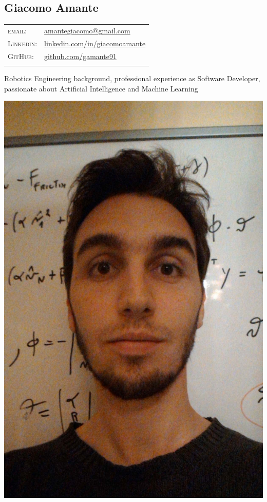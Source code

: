 \documentclass[a4paper,10pt]{article}
\begin{document}
	
	\pagestyle{empty}

	\begin{minipage}{.75\textwidth}
		\vspace{-10mm}
		\begin{flushleft}
			\section{\Huge Giacomo Amante}
			\vspace{2mm}
			\begin{tabular}{ll}
				\textsc{email:} & \href{mailto:amantegiacomo@gmail.com}{amantegiacomo@gmail.com} \\
				\textsc{Linkedin:} & 
				\href{http://www.linkedin.com/in/giacomoamante}{\color{black}linkedin.com/in/giacomoamante}\\
				\textsc{GitHub:} & \href{https://github.com/gamante91}{github.com/gamante91}\\
				\multicolumn{2}{c}{} \\
			\end{tabular}
		\end{flushleft}
	Robotics Engineering background, professional experience as Software Developer,\\
	passionate about Artificial Intelligence and Machine Learning\\
	\end{minipage}
	\begin{minipage}[c]{.25\textwidth}
		\begin{flushright}
			\includegraphics[width=.55\textwidth]{GiacomoAmante_lowres}
		\end{flushright}
	\end{minipage}
\end{document}
